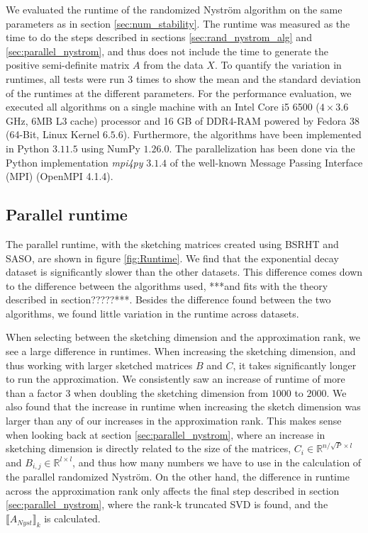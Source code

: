 \documentclass{article}
\theoremstyle{definition}
\begin{document}
We evaluated the runtime of the randomized Nyström algorithm on the same parameters as in section \ref{sec:num_stability}. The runtime was measured as the time to do the steps described in sections \ref{sec:rand_nystrom_alg} and \ref{sec:parallel_nystrom}, and thus does not include the time to generate the positive semi-definite matrix $A$ from the data $X$. To quantify the variation in runtimes, all tests were run 3 times to show the mean and the standard deviation of the runtimes at the different parameters. For the performance evaluation, we executed all algorithms on a single machine with an Intel Core i5 6500 ($4 \times 3.6$ GHz, $6$MB L3 cache) processor and 16 GB of DDR4-RAM powered by Fedora 38 (64-Bit, Linux Kernel $6.5.6$). Furthermore, the algorithms have been implemented in Python $3.11.5$ using NumPy $1.26.0$. The parallelization has been done via the Python implementation \textit{mpi4py} $3.1.4$ of the well-known Message Passing Interface (MPI) (OpenMPI 4.1.4).\newline


\subsection{Parallel runtime}
The parallel runtime, with the sketching matrices created using BSRHT and SASO, are shown in figure \ref{fig:Runtime}. We find that the exponential decay dataset is significantly slower than the other datasets. This difference comes down to the difference between the algorithms used, ***and fits with the theory described in section?????***. Besides the difference found between the two algorithms, we found little variation in the runtime across datasets. \newline

When selecting between the sketching dimension and the approximation rank, we see a large difference in runtimes. When increasing the sketching dimension, and thus working with larger sketched matrices $B$ and $C$, it takes significantly longer to run the approximation. We consistently saw an increase of runtime of more than a factor 3 when doubling the sketching dimension from $1000$ to $2000$. We also found that the increase in runtime when increasing the sketch dimension was larger than any of our increases in the approximation rank. This makes sense when looking back at section \ref{sec:parallel_nystrom}, where an increase in sketching dimension is directly related to the size of the matrices, $C_i\in\mathbb{R}^{n/\sqrt{P}\times l}$ and $B_{i,j}\in\mathbb{R}^{l\times l}$, and thus how many numbers we have to use in the calculation of the parallel randomized Nyström. On the other hand, the difference in runtime across the approximation rank only affects the final step described in section \ref{sec:parallel_nystrom}, where the rank-k truncated SVD is found, and the $\llbracket A_{Nyst}\rrbracket_k$ is calculated.
\end{document}
